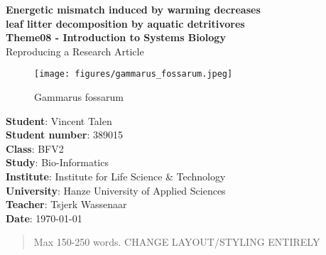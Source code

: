 

\begin{center}
  \topskip=45pt
  \LARGE{\textbf{Energetic mismatch induced by warming decreases\\leaf litter decomposition by aquatic detritivores}}\\
  \vspace*{20pt}
  \large{\textbf{Theme08 - Introduction to Systems Biology}}\\
  \large{Reproducing a Research Article}\\
  \vspace*{40pt}
  \begin{figure}
    \centering
    \texttt{[image: figures/gammarus\_fossarum.jpeg]}
    \caption{Gammarus fossarum}
    \label{fig:g.fossarum}
  \end{figure}
\end{center}
\vspace*{\fill}
\begin{flushright}
  \textbf{Student}: Vincent Talen\\
  \textbf{Student number}: 389015\\
  \textbf{Class}: BFV2\\
  \textbf{Study}: Bio-Informatics\\
  \textbf{Institute}: Institute for Life Science \& Technology\\
  \textbf{University}: Hanze University of Applied Sciences\\
  \textbf{Teacher}: Tsjerk Wassenaar\\
  \textbf{Date}: \today\\
\end{flushright}


\newpage
\null


\newpage
{}
\begin{abstract}
Max 150-250 words. CHANGE LAYOUT/STYLING ENTIRELY
\end{abstract}


\newpage
\setcounter{secnumdepth}{2}
\renewcommand{\contentsname}{Table of Contents}
\tableofcontents


\newpage
\listoffigures 
\listoftables


\newpage

